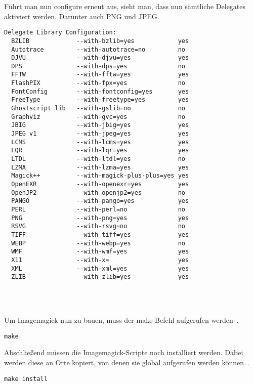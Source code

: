 Führt man nun configure erneut aus, sieht man, dass nun sämtliche Delegates aktiviert werden.
Darunter auch PNG und JPEG.
\begin{verbatim}
Delegate Library Configuration:
  BZLIB             --with-bzlib=yes            yes
  Autotrace         --with-autotrace=no         no
  DJVU              --with-djvu=yes             yes
  DPS               --with-dps=yes              no
  FFTW              --with-fftw=yes             yes
  FlashPIX          --with-fpx=yes              no
  FontConfig        --with-fontconfig=yes       yes
  FreeType          --with-freetype=yes         yes
  Ghostscript lib   --with-gslib=no             no
  Graphviz          --with-gvc=yes              no
  JBIG              --with-jbig=yes             yes
  JPEG v1           --with-jpeg=yes             yes
  LCMS              --with-lcms=yes             yes
  LQR               --with-lqr=yes              yes
  LTDL              --with-ltdl=yes             no
  LZMA              --with-lzma=yes             yes
  Magick++          --with-magick-plus-plus=yes yes
  OpenEXR           --with-openexr=yes          yes
  OpenJP2           --with-openjp2=yes          no
  PANGO             --with-pango=yes            yes
  PERL              --with-perl=no              no
  PNG               --with-png=yes              yes
  RSVG              --with-rsvg=no              no
  TIFF              --with-tiff=yes             yes
  WEBP              --with-webp=yes             no
  WMF               --with-wmf=yes              yes
  X11               --with-x=                   yes
  XML               --with-xml=yes              yes
  ZLIB              --with-zlib=yes             yes
\end{verbatim}\\\\
\vspace{5mm}

Um Imagemagick nun zu bauen, muss der make-Befehl aufgerufen werden~\cite{HowInstallImageMagick}.
\begin{verbatim}
make
\end{verbatim}
\vspace{5mm}

Abschließend müssen die Imagemagick-Scripte noch installiert werden.
Dabei werden diese an Orte kopiert, von denen sie global aufgerufen werden können~\cite{HowInstallImageMagick}.
\begin{verbatim}
make install
\end{verbatim}
\vspace{5mm}